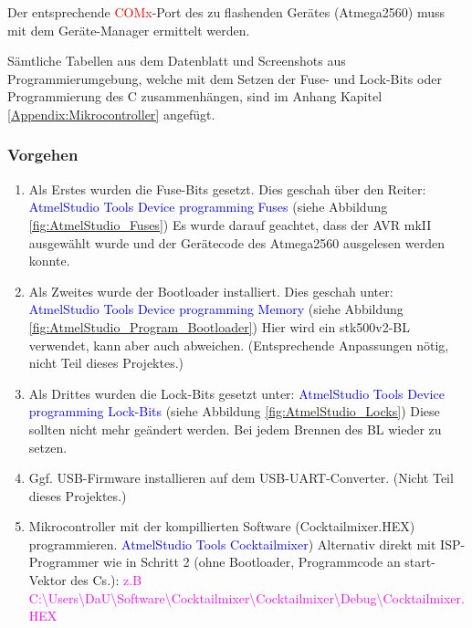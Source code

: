 Der entsprechende \textcolor{red}{ COMx}-Port des zu flashenden Gerätes (Atmega2560) muss mit dem Geräte-Manager ermittelt werden.



Sämtliche Tabellen aus dem Datenblatt und Screenshots aus Programmierumgebung, welche mit dem Setzen der Fuse- und Lock-Bits oder Programmierung des \textmu C zusammenhängen, sind im Anhang Kapitel \ref{Appendix:Mikrocontroller} angefügt.

\subsubsection{Vorgehen}\label{subsubsec:Inbetriebnahme_uC_Vorgehen}

\begin{enumerate}
\item Als Erstes wurden die Fuse-Bits gesetzt. Dies geschah über den Reiter:\newline
\textcolor{blue}{AtmelStudio \textrightarrow Tools \textrightarrow Device programming \textrightarrow Fuses} (siehe Abbildung \ref{fig:AtmelStudio_Fuses}) \newline
Es wurde darauf geachtet, dass der AVR mkII ausgewählt wurde und der Gerätecode des Atmega2560 ausgelesen werden konnte.
\newline
\item Als Zweites wurde der Bootloader installiert. Dies geschah unter:\newline
\textcolor{blue}{AtmelStudio \textrightarrow Tools \textrightarrow Device programming \textrightarrow Memory} (siehe Abbildung \ref{fig:AtmelStudio_Program_Bootloader}) \newline
Hier wird ein stk500v2-BL verwendet, kann aber auch abweichen. (Entsprechende Anpassungen nötig, nicht Teil dieses Projektes.)\newline
\item Als Drittes wurden die Lock-Bits gesetzt unter:\newline
\textcolor{blue}{AtmelStudio \textrightarrow Tools \textrightarrow Device programming \textrightarrow Lock-Bits} (siehe Abbildung \ref{fig:AtmelStudio_Locks})\newline
Diese sollten nicht mehr geändert werden. Bei jedem Brennen des BL wieder zu setzen.\newline
\item Ggf. USB-Firmware installieren auf dem USB-UART-Converter. (Nicht Teil dieses Projektes.)\newline
\item Mikrocontroller mit der kompillierten Software (Cocktailmixer.HEX) programmieren.\newline
\textcolor{blue}{AtmelStudio \textrightarrow Tools \textrightarrow Cocktailmixer})\newline
Alternativ direkt mit ISP-Programmer wie in Schritt 2 (ohne Bootloader, Programmcode an start-Vektor des \textmu Cs.):\newline
\textcolor{magenta}{z.B C:\textbackslash Users\textbackslash DaU\textbackslash Software\textbackslash Cocktailmixer\textbackslash Cocktailmixer\textbackslash Debug\textbackslash Cocktailmixer.HEX}
\end{enumerate}

